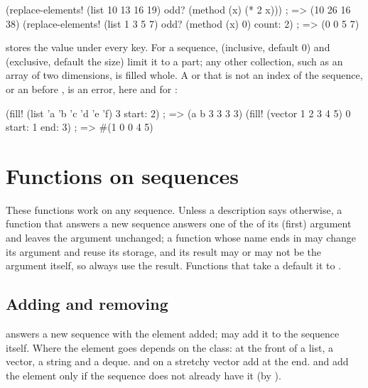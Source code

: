 \begin{dylan}
(replace-elements! (list 10 13 16 19) odd? (method (x) (* 2 x)))
; => (10 26 16 38)
(replace-elements! (list 1 3 5 7) odd? (method (x) 0) count: 2)
; => (0 0 5 7)
\end{dylan}

 stores the value under
every key. For a sequence,  (inclusive, default 0) and
 (exclusive, default the size) limit it to a part; any other
collection, such as an array of two dimensions, is filled whole. A
 or  that is not an index of the sequence, or an
 before , is an error, here and for
:

\begin{dylan}
(fill! (list 'a 'b 'c 'd 'e 'f) 3 start: 2)      ; => (a b 3 3 3 3)
(fill! (vector 1 2 3 4 5) 0 start: 1 end: 3)     ; => #(1 0 0 4 5)
\end{dylan}

\section{Functions on sequences}\label{sec:collections-sequences}

These functions work on any sequence. Unless a description says
otherwise, a function that answers a new sequence answers one of the
 of its (first) argument and leaves the argument
unchanged; a function whose name ends in \code{!} may change its argument
and reuse its storage, and its result may or may not be the argument
itself, so always use the result. Functions that take a 
default it to .

\subsection{Adding and removing}

 answers a new sequence with
the element added;  may add it to the sequence itself. Where
the element goes depends on the class: at the front of a list, a vector,
a string and a deque.  and  on a stretchy vector
add at the end.
 and  add the element only if the sequence
does not already have it (by ).

